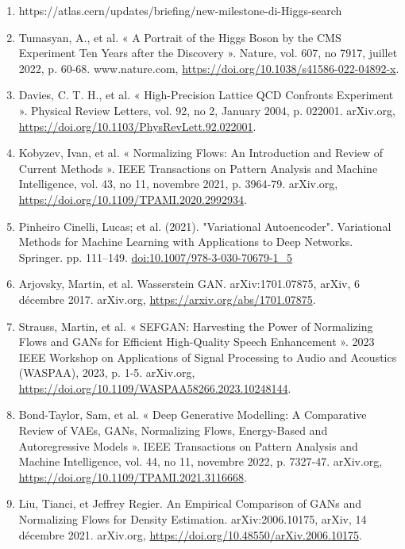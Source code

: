 \documentclass [12pt] {article}
\numberwithin{equation}{section} %
\numberwithin{figure}{section}   %
\begin{document}
\begin{enumerate}
    \label{POWHEG}
    \item https://atlas.cern/updates/briefing/new-milestone-di-Higgs-search \label{di-higgs decay 20 times}
    \item Tumasyan, A., et al. « A Portrait of the Higgs Boson by the CMS Experiment Ten Years after the Discovery ». Nature, vol. 607, no 7917, juillet 2022, p. 60‑68. www.nature.com, \url{https://doi.org/10.1038/s41586-022-04892-x}.
    \label{Nature}
    \item Davies, C. T. H., et al. « High-Precision Lattice QCD Confronts Experiment ». Physical Review Letters, vol. 92, no 2, January 2004, p. 022001. arXiv.org, \url{https://doi.org/10.1103/PhysRevLett.92.022001}. \label{QCD lattice}


    
    \item Kobyzev, Ivan, et al. « Normalizing Flows: An Introduction and Review of Current Methods ». IEEE Transactions on Pattern Analysis and Machine Intelligence, vol. 43, no 11, novembre 2021, p. 3964‑79. arXiv.org, \url{https://doi.org/10.1109/TPAMI.2020.2992934}. \label{NF}
    \item Pinheiro Cinelli, Lucas; et al. (2021). "Variational Autoencoder". Variational Methods for Machine Learning with Applications to Deep Networks. Springer. pp. 111–149. \url{doi:10.1007/978-3-030-70679-1_5} \label{VAE}
    \item Arjovsky, Martin, et al. Wasserstein GAN. arXiv:1701.07875, arXiv, 6 décembre 2017. arXiv.org, \url{https://arxiv.org/abs/1701.07875}. \label{WCGAN}
    \item Strauss, Martin, et al. « SEFGAN: Harvesting the Power of Normalizing Flows and GANs for Efficient High-Quality Speech Enhancement ». 2023 IEEE Workshop on Applications of Signal Processing to Audio and Acoustics (WASPAA), 2023, p. 1‑5. arXiv.org, \url{https://doi.org/10.1109/WASPAA58266.2023.10248144}. \label{speech}
    \item Bond-Taylor, Sam, et al. « Deep Generative Modelling: A Comparative Review of VAEs, GANs, Normalizing Flows, Energy-Based and Autoregressive Models ». IEEE Transactions on Pattern Analysis and Machine Intelligence, vol. 44, no 11, novembre 2022, p. 7327‑47. arXiv.org, \url{https://doi.org/10.1109/TPAMI.2021.3116668}. \label{GAN NF VAE}
    \item Liu, Tianci, et Jeffrey Regier. An Empirical Comparison of GANs and Normalizing Flows for Density Estimation. arXiv:2006.10175, arXiv, 14 décembre 2021. arXiv.org, \url{https://doi.org/10.48550/arXiv.2006.10175}. \label{GAN vs NF}
    
\end{enumerate}
\end{document}
